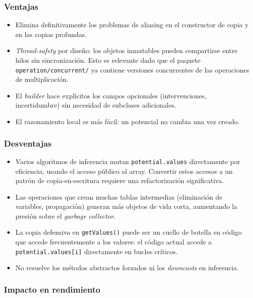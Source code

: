 \documentclass[11pt,a4paper]{article}
\newcommand{\code}[1]{\texttt{#1}}
\begin{document}
\subsubsection*{Ventajas}

\begin{itemize}
  \item Elimina definitivamente los problemas de aliasing en el constructor de
        copia y en las copias profundas.
  \item \emph{Thread-safety} por diseño: los objetos inmutables pueden compartirse
        entre hilos sin sincronización.  Esto es relevante dado que el paquete
        \code{operation/concurrent/} ya contiene versiones concurrentes de las
        operaciones de multiplicación.
  \item El \emph{builder} hace explícitos los campos opcionales (intervenciones,
        incertidumbre) sin necesidad de subclases adicionales.
  \item El razonamiento local es más fácil: un potencial no cambia una vez
        creado.
\end{itemize}

\subsubsection*{Desventajas}

\begin{itemize}
  \item Varios algoritmos de inferencia mutan \code{potential.values} directamente
        por eficiencia, usando el acceso público al array.  Convertir estos
        accesos a un patrón de copia-en-escritura requiere una refactorización
        significativa.
  \item Las operaciones que crean muchas tablas intermedias (eliminación de
        variables, propagación) generan más objetos de vida corta, aumentando
        la presión sobre el \emph{garbage collector}.
  \item La copia defensiva en \code{getValues()} puede ser un cuello de botella en
        código que accede frecuentemente a los valores: el código actual accede
        a \code{potential.values[i]} directamente en bucles críticos.
  \item No resuelve los métodos abstractos forzados ni los \emph{downcasts} en
        inferencia.
\end{itemize}

\subsubsection*{Impacto en rendimiento}
\end{document}
